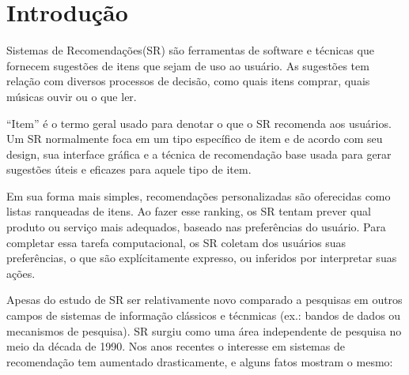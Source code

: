 \section{Introdução}
\par
Sistemas de Recomendações(SR) são ferramentas de software e técnicas que fornecem sugestões de itens que sejam de uso ao usuário. As sugestões tem relação com diversos processos de decisão, como quais itens comprar, quais músicas ouvir ou o que ler.
\par
``Item'' é o termo geral usado para denotar o que o SR recomenda aos usuários. Um SR normalmente foca em um tipo específico de item e de acordo com seu design, sua interface gráfica e a técnica de recomendação base usada para gerar sugestões úteis e eficazes para aquele tipo de item.
\par
Em sua forma mais simples, recomendações personalizadas são oferecidas como listas ranqueadas de itens. Ao fazer esse ranking, os SR tentam prever qual produto ou serviço mais adequados, baseado nas preferências do usuário. Para completar essa tarefa computacional, os SR coletam dos usuários suas preferências, o que são explícitamente expresso, ou inferidos por interpretar suas ações.
\par
Apesas do estudo de SR ser relativamente novo comparado a pesquisas em outros campos de sistemas de informação clássicos e técnmicas (ex.: bandos de dados ou mecanismos de pesquisa). SR surgiu como uma área independente de pesquisa no meio da década de 1990. Nos anos recentes o interesse em sistemas de recomendação tem aumentado drasticamente, e alguns fatos mostram o mesmo:
